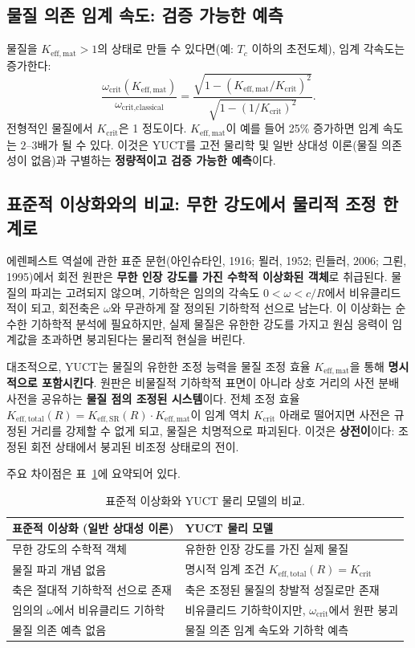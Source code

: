 \documentclass[12pt,a4paper]{article}
\newcommand{\Keffmat}{K_{\mathrm{eff,mat}}}
\newcommand{\Kefftot}{K_{\mathrm{eff,total}}}
\newcommand{\KeffSR}{K_{\mathrm{eff,SR}}}
\newcommand{\Kcrit}{K_{\mathrm{crit}}}
\begin{document}
	\subsection{물질 의존 임계 속도: 검증 가능한 예측}
	
	물질을 \(K_{\mathrm{eff,mat}} > 1\)의 상태로 만들 수 있다면(예: \(T_c\) 이하의 초전도체), 임계 각속도는 증가한다:
	\[
	\frac{\omega_{\text{crit}}(K_{\mathrm{eff,mat}})}{\omega_{\text{crit,classical}}} = \frac{ \sqrt{1 - (\Keffmat/\Kcrit)^2} }{ \sqrt{1 - (1/\Kcrit)^2} }.
	\]
	전형적인 물질에서 \(\Kcrit\)은 1 정도이다. \(\Keffmat\)이 예를 들어 25\% 증가하면 임계 속도는 \(2\)–\(3\)배가 될 수 있다. 이것은 YUCT를 고전 물리학 및 일반 상대성 이론(물질 의존성이 없음)과 구별하는 \textbf{정량적이고 검증 가능한 예측}이다.
	
	\subsection{표준적 이상화와의 비교: 무한 강도에서 물리적 조정 한계로}
	
	에렌페스트 역설에 관한 표준 문헌(아인슈타인, 1916; 묄러, 1952; 린들러, 2006; 그뢴, 1995)에서 회전 원판은 \textbf{무한 인장 강도를 가진 수학적 이상화된 객체}로 취급된다. 물질의 파괴는 고려되지 않으며, 기하학은 임의의 각속도 \(0 < \omega < c/R\)에서 비유클리드적이 되고, 회전축은 \(\omega\)와 무관하게 잘 정의된 기하학적 선으로 남는다. 이 이상화는 순수한 기하학적 분석에 필요하지만, 실제 물질은 유한한 강도를 가지고 원심 응력이 임계값을 초과하면 붕괴된다는 물리적 현실을 버린다.
	
	대조적으로, YUCT는 물질의 유한한 조정 능력을 물질 조정 효율 \(K_{\mathrm{eff,mat}}\)을 통해 \textbf{명시적으로 포함시킨다}. 원판은 비물질적 기하학적 표면이 아니라 상호 거리의 사전 분배 사전을 공유하는 \textbf{물질 점의 조정된 시스템}이다. 전체 조정 효율 \(\Kefftot(R) = \KeffSR(R) \cdot \Keffmat\)이 임계 역치 \(\Kcrit\) 아래로 떨어지면 사전은 규정된 거리를 강제할 수 없게 되고, 물질은 치명적으로 파괴된다. 이것은 \textbf{상전이}이다: 조정된 회전 상태에서 붕괴된 비조정 상태로의 전이.
	
	주요 차이점은 표~\ref{tab:idealization}에 요약되어 있다.
	
	\begin{table}[h]
		\centering
		\caption{표준적 이상화와 YUCT 물리 모델의 비교.}
		\label{tab:idealization}
		\begin{tabular}{p{5cm}p{5cm}}
			\toprule
			\textbf{표준적 이상화 (일반 상대성 이론)} & \textbf{YUCT 물리 모델} \\
			\midrule
			무한 강도의 수학적 객체 & 유한한 인장 강도를 가진 실제 물질 \\
			물질 파괴 개념 없음 & 명시적 임계 조건 \(\Kefftot(R) = \Kcrit\) \\
			축은 절대적 기하학적 선으로 존재 & 축은 조정된 물질의 창발적 성질로만 존재 \\
			임의의 \(\omega\)에서 비유클리드 기하학 & 비유클리드 기하학이지만, \(\omega_{\text{crit}}\)에서 원판 붕괴 \\
			물질 의존 예측 없음 & 물질 의존 임계 속도와 기하학 예측 \\
			\bottomrule
		\end{tabular}
	\end{table}
	
\end{document}
